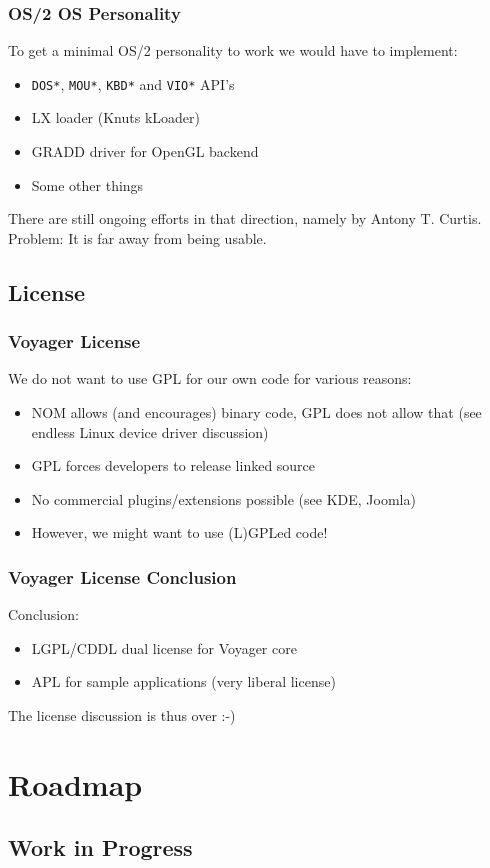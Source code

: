 \documentclass{beamer}
\begin{document}
\begin{frame}
\frametitle{OS/2 OS Personality}
To get a minimal OS/2 personality to work we would have to implement:
\begin{itemize}[<+->]
  \item \texttt{DOS*}, \texttt{MOU*}, \texttt{KBD*} and \texttt{VIO*} API's
  \item LX loader (Knuts kLoader)
  \item GRADD driver for OpenGL backend
  \item Some other things
\end{itemize}
There are still ongoing efforts in that direction, namely by Antony T. Curtis.
Problem: It is far away from being usable.
\end{frame}

\subsection{License}

\begin{frame}
\frametitle{Voyager License}
We do not want to use GPL for our own code for various reasons:
\begin{itemize}[<+->]
  \item NOM allows (and encourages) binary code, GPL does not allow
  that (see endless Linux device driver discussion)
  \item GPL forces developers to release linked source
  \item No commercial plugins/extensions possible (see KDE, Joomla)
  \item However, we might want to use (L)GPLed code!
\end{itemize}
\end{frame}
\begin{frame}
\frametitle{Voyager License Conclusion}
Conclusion:
\begin{itemize}[<+->]
  \item LGPL/CDDL dual license for Voyager core
  \item APL for sample applications (very liberal license)
\end{itemize}
The license discussion is thus over :-)
\end{frame}

\section{Roadmap}
\subsection{Work in Progress}
\end{document}
